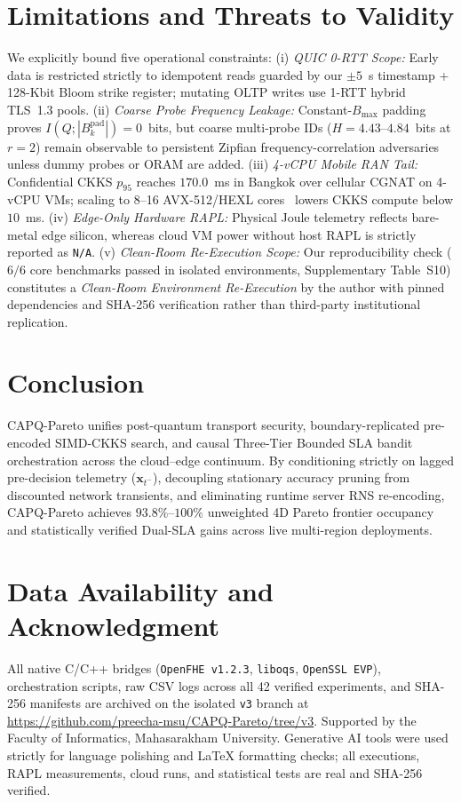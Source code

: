 \documentclass[10pt,journal,compsoc]{IEEEtran}
\begin{document}
\section{Limitations and Threats to Validity}\label{sec:limitations}
We explicitly bound five operational constraints: (i) \emph{QUIC 0-RTT Scope:} Early data is restricted strictly to idempotent reads guarded by our $\pm 5$~s timestamp + 128-Kbit Bloom strike register; mutating OLTP writes use 1-RTT hybrid TLS~1.3 pools. (ii) \emph{Coarse Probe Frequency Leakage:} Constant-$B_{\max}$ padding proves $I(Q;|B_k^{\mathrm{pad}}|)=0$~bits, but coarse multi-probe IDs ($H=4.43$--$4.84$~bits at $r=2$) remain observable to persistent Zipfian frequency-correlation adversaries unless dummy probes or ORAM are added. (iii) \emph{4-vCPU Mobile RAN Tail:} Confidential CKKS $p_{95}$ reaches $170.0$~ms in Bangkok over cellular CGNAT on 4-vCPU VMs; scaling to 8--16 AVX-512/HEXL cores~\cite{boemer2021hexl} lowers CKKS compute below $10$~ms. (iv) \emph{Edge-Only Hardware RAPL:} Physical Joule telemetry reflects bare-metal edge silicon, whereas cloud VM power without host RAPL is strictly reported as \texttt{N/A}. (v) \emph{Clean-Room Re-Execution Scope:} Our reproducibility check ($6/6$ core benchmarks passed in isolated environments, Supplementary Table~S10) constitutes a \emph{Clean-Room Environment Re-Execution} by the author with pinned dependencies and SHA-256 verification rather than third-party institutional replication.

\section{Conclusion}
CAPQ-Pareto unifies post-quantum transport security, boundary-replicated pre-encoded SIMD-CKKS search, and causal Three-Tier Bounded SLA bandit orchestration across the cloud--edge continuum. By conditioning strictly on lagged pre-decision telemetry ($\mathbf{x}_{t^-}$), decoupling stationary accuracy pruning from discounted network transients, and eliminating runtime server RNS re-encoding, CAPQ-Pareto achieves $93.8\%$--$100\%$ unweighted 4D Pareto frontier occupancy and statistically verified Dual-SLA gains across live multi-region deployments.

\section*{Data Availability and Acknowledgment}
All native C/C++ bridges (\texttt{OpenFHE v1.2.3}, \texttt{liboqs}, \texttt{OpenSSL EVP}), orchestration scripts, raw CSV logs across all 42 verified experiments, and SHA-256 manifests are archived on the isolated \texttt{v3} branch at \url{https://github.com/preecha-msu/CAPQ-Pareto/tree/v3}. Supported by the Faculty of Informatics, Mahasarakham University. Generative AI tools were used strictly for language polishing and \LaTeX{} formatting checks; all executions, RAPL measurements, cloud runs, and statistical tests are real and SHA-256 verified.
\end{document}
